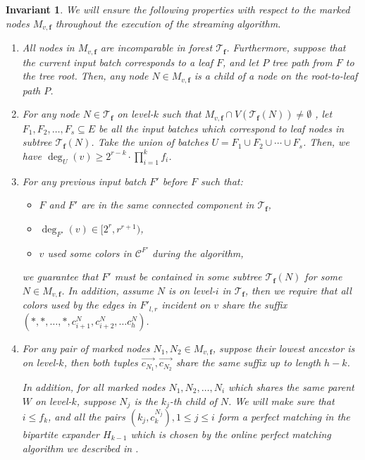 \documentclass[11pt,a4paper]{article}
\newtheorem{invariant}{Invariant}[section]
\newcommand{\tree}{\mathcal{T}}
\newcommand{\freq}{\mathbf{f}}
\newcommand{\clr}{\mathcal{C}}
\begin{document}
\begin{invariant}\label{det-inv}
	We will ensure the following properties with respect to the marked nodes $M_{v, \freq}$ throughout the execution of the streaming algorithm.
	\begin{enumerate}[(1)]
		\item All nodes in $M_{v, \freq}$ are incomparable in forest $\tree_{\freq}$. Furthermore, suppose that the current input batch corresponds to a leaf $F$, and let $P$ tree path from $F$ to the tree root. Then, any node $N\in M_{v, \freq}$ is a child of a node on the root-to-leaf path $P$.
		
		\item For any node $N\in \tree_\freq$ on level-$k$ such that $M_{v, \freq}\cap V(\tree_\freq(N))\neq \emptyset$ , let $F_1, F_2, \ldots, F_s\subseteq E$ be all the input batches which correspond to leaf nodes in subtree $\tree_\freq(N)$. Take the union of batches $U = F_1\cup F_2\cup\cdots \cup F_s$. Then, we have $\deg_U(v)\geq 2^{r-k}\cdot\prod_{i = 1}^k f_i$.
		
		\item For any previous input batch $F'$ before $F$ such that:
		\begin{itemize}
			\item $F$ and $F'$ are in the same connected component in $\tree_\freq$,
			\item $\deg_{F'}(v)\in [2^r, r^{r+1})$,
			\item $v$ used some colors in $\clr^{F'}$ during the algorithm,
		\end{itemize} 
		we guarantee that $F'$ must be contained in some subtree $\tree_{\freq}(N)$ for some $N\in M_{v, \freq}$. In addition, assume $N$ is on level-$i$ in $\tree_\freq$, then we require that all colors used by the edges in $F'_{l, r}$ incident on $v$ share the suffix $\left(*, *, \ldots, *, c^N_{i+1}, c^N_{i+2}, \ldots c^N_h\right)$.
		
		\item For any pair of marked nodes $N_1, N_2\in M_{v, \freq}$, suppose their lowest ancestor is on level-$k$, then both tuples $\overrightarrow{c_{N_1}}, \overrightarrow{c_{N_2}}$ share the same suffix up to length $h-k$.
		
		In addition, for all marked nodes $N_1, N_2, \ldots, N_i$ which shares the same parent $W$ on level-$k$, suppose $N_j$ is the $k_j$-th child of $N$. We will make sure that $i\leq f_k$, and all the pairs $\left(k_j, c_{k}^{N_j}\right), 1\leq j\leq i$ form a perfect matching in the bipartite expander $H_{k-1}$ which is chosen by the online perfect matching algorithm we described in .
	\end{enumerate}
\end{invariant}
\end{document}

